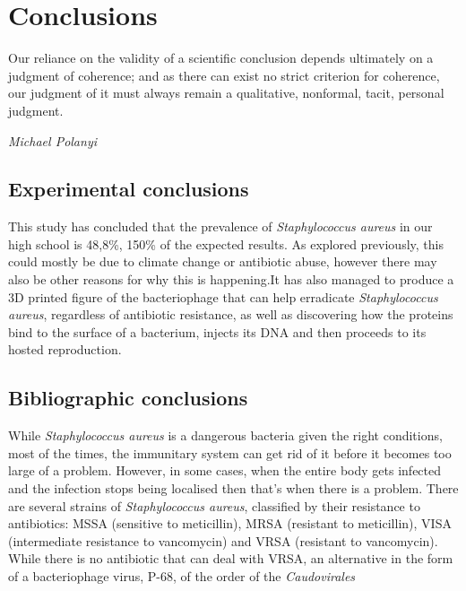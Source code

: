 \chapter{Conclusions}
\epigraph{Our reliance on the validity of a scientific conclusion depends ultimately on a judgment of coherence; and as there can exist no strict criterion for coherence, our judgment of it must always remain a qualitative, nonformal, tacit, personal judgment.}{\textit{Michael Polanyi}}
\section{Experimental conclusions}
This study has concluded that the prevalence of \emph{Staphylococcus aureus} in our high school is 48,8\%, 150\% of the expected results. As explored previously, this could mostly be due to climate change or antibiotic abuse, however there may also be other reasons for why this is happening.\newline It has also managed to produce a 3D printed figure of the bacteriophage that can help erradicate \emph{Staphylococcus aureus}, regardless of antibiotic resistance, as well as discovering how the proteins bind to the surface of a bacterium, injects its DNA and then proceeds to its hosted reproduction.
\section{Bibliographic conclusions}
While \emph{Staphylococcus aureus} is a dangerous bacteria given the right conditions, most of the times, the immunitary system can get rid of it before it becomes too large of a problem. However, in some cases, when the entire body gets infected and the infection stops being localised then that's when there is a problem. There are several strains of \emph{Staphylococcus aureus}, classified by their resistance to antibiotics: MSSA (sensitive to meticillin), MRSA (resistant to meticillin), VISA (intermediate resistance to vancomycin) and VRSA (resistant to vancomycin). While there is no antibiotic that can deal with VRSA, an alternative in the form of a bacteriophage virus, P-68, of the order of the \emph{Caudovirales}
